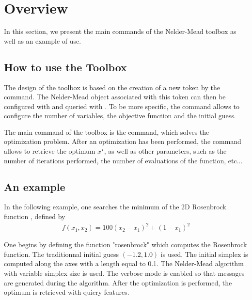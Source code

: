 \chapter{Overview}

In this section, we present the main commands of the Nelder-Mead
toolbox as well as an example of use.


\section{How to use the Toolbox}

The design of the toolbox is based on the creation of 
a new token by the  command.
The Nelder-Mead object associated with this token can then 
be configured with  and queried 
with . To be more specific, the
 command allows to configure the 
number of variables, the objective function and the initial guess.

The main command of the toolbox is the  command, which
solves the optimization problem. After an optimization has been performed,
the  command allows to retrieve the optimum $x^\star$,
as well as other parameters, such as the number of iterations performed, the number 
of evaluations of the function, etc...

\section{An example}

In the following example, one searches the minimum of the 2D Rosenbrock function \cite{citeulike:1903787}, 
defined by
\begin{eqnarray}
f(x_1,x_2) = 100(x_2 - x_1)^2 + (1-x_1)^2
\end{eqnarray}

One begins by defining the function "rosenbrock" which computes the Rosenbrock function. 
The traditionnal initial guess $(-1.2 , 1.0)$ is used. The initial simplex is computed along 
the axes with a length equal to 0.1. The Nelder-Mead algorithm with variable simplex size 
is used. The verbose mode is enabled so that messages are generated during the algorithm. 
After the optimization is performed, the optimum is retrieved with quiery features.

